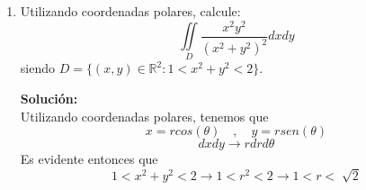 \documentclass[12pt]{article}
\newenvironment{solucion}
{\begin{mdframed}[backgroundcolor=black!10]
		{\bf Solución:}\\
	}
	{
	\end{mdframed}
}
\newenvironment{preguntas}
{\begin{enumerate}\itemsep12pt
	}
	{
	\end{enumerate}
}
\newcommand{\ev}{\Big|}
\newcommand{\ra}{\rightarrow}
\newcommand{\R}{\mathbb{R}}
\begin{document}
\begin{preguntas}
\begin{solucion}
\begin{enumerate}[a)]
\item $\displaystyle\int_0^1 \displaystyle\int_{\sqrt[]{x}}^1 \dfrac{x}{\sqrt[]{x^2+y^2}} dydx$\\
			\\
			Graficamos:
			\begin{center}
			\end{center}
			Tenemos que $y=\sqrt[]{x} \ra x = y^2$. De esta forma,
			$$\displaystyle\int_0^1 \displaystyle\int_{\sqrt[]{x}}^1 \dfrac{x}{\sqrt[]{x^2+y^2}} dydx =
			\displaystyle\int_0^1 \displaystyle\int_0^{y^2} \dfrac{x}{\sqrt[]{x^2+y^2}} dxdy$$
			Resolviendo esta integral, tenemos
			$$= \displaystyle\int_0^1 \displaystyle\int_0^{y^2} \dfrac{x}{\sqrt[]{x^2+y^2}} dxdy$$
			$$= \displaystyle\int_0^1 \left( \displaystyle\int_0^{y^2} \dfrac{1}{2} \dfrac{2x}{\sqrt[]{x^2+y^2}} dx \right) dy$$
			Haciendo el cambio de variable $u=x^2 \ra du = 2xdx$ en la integral de más adentro
			$$= \displaystyle\int_0^1 \left( \displaystyle\int_0^{y^4} \dfrac{du}{2\ \sqrt[]{u+y^2}} \right) dy$$
			$$= \displaystyle\int_0^1\sqrt[]{u+y^2} \ev_0^{y^4} dy$$
			$$= \displaystyle\int_0^1\sqrt[]{y^4+y^2} -|y| dy$$
			Como el intervalo de integración es positivo, sabemos que $|y| = y$
			$$= \displaystyle\int_0^1 y\ \sqrt[]{y^2+1} -y dy$$
			Haciendo $u=y^2 \ra du = 2ydy$
			$$= \dfrac{1}{2}\displaystyle\int_0^1 y\ \sqrt[]{u+1} du - \dfrac{1}{2}$$
			$$= \dfrac{1}{2} \cdot \dfrac{2}{3} (2^{3/2}-1) - \dfrac{1}{2}$$
			$$= \dfrac{2\ \sqrt[]{2}}{3} - \dfrac{5}{6}$$
\end{enumerate}
\end{solucion}
\item Utilizando coordenadas polares, calcule:
	$$ \displaystyle\iint\limits_D \dfrac{x^2y^2}{(x^2+y^2)^2}dxdy $$
	siendo $D = \{ (x,y) \in \R^2 : 1 < x^2 + y^2 < 2\}$.
\begin{solucion}
Utilizando coordenadas polares, tenemos que
		$$x = rcos(\theta) \quad , \quad y = rsen(\theta)$$
		$$dxdy \ra rdrd\theta$$
		Es evidente entonces que
		$$ 1 < x^2 + y^2 < 2 \ra 1 < r^2 < 2 \ra 1 < r < \sqrt[]{2}$$

\end{solucion}
\end{preguntas}
\end{document}

